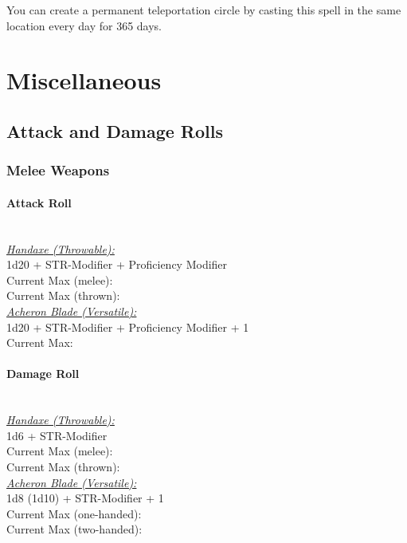 \documentclass[letterpaper,openany,oneside,twocolumn]{book}
\begin{document}
You can create a permanent teleportation circle by casting this spell in the same location every day for 365 days.
\vfill\eject
\section*{Miscellaneous}
\subsection*{Attack and Damage Rolls}
\subsubsection*{Melee Weapons}
\paragraph*{Attack Roll}\hfill\\
\underline{\textit{Handaxe (Throwable):}}\\
1d20 + STR-Modifier + Proficiency Modifier\\
\indent Current Max (melee): \\
\indent Current Max (thrown): 
\\
\underline{\textit{Acheron Blade (Versatile):}}\\
1d20 + STR-Modifier + Proficiency Modifier + 1\\
\indent Current Max: 
\paragraph*{Damage Roll}\hfill\\
\underline{\textit{Handaxe (Throwable):}}\\
1d6 + STR-Modifier\\
\indent Current Max (melee): \\
\indent Current Max (thrown): 
\\
\underline{\textit{Acheron Blade (Versatile):}}\\
1d8 (1d10) + STR-Modifier + 1\\
\indent Current Max (one-handed): \\
\indent Current Max (two-handed): 
\end{document}
